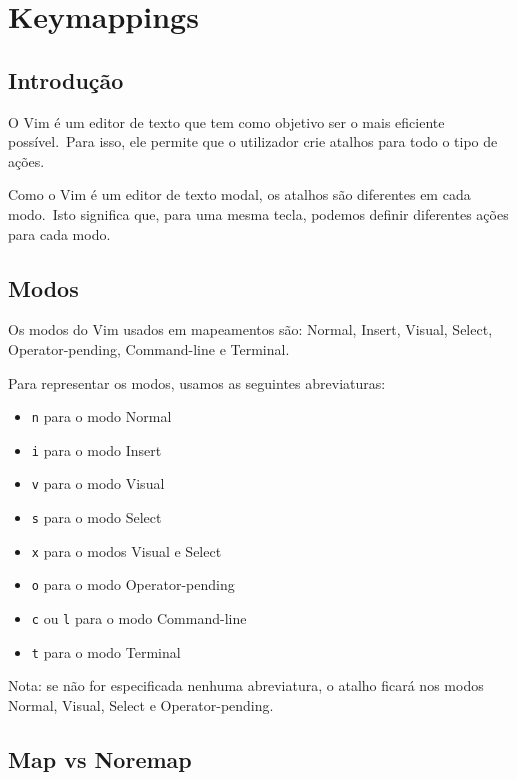 \chapter{Keymappings}
\label{chap:keymappings}

\section{Introdução}

O Vim é um editor de texto que tem como objetivo ser o mais eficiente possível.\ Para isso, ele permite que o utilizador crie atalhos para todo o tipo de ações.

Como o Vim é um editor de texto modal, os atalhos são diferentes em cada modo.\ Isto significa que, para uma mesma tecla, podemos definir diferentes ações para cada modo.

\section{Modos}

Os modos do Vim usados em mapeamentos são: Normal, Insert, Visual, Select, Operator-pending, Command-line e Terminal.

Para representar os modos, usamos as seguintes abreviaturas:

\begin{itemize}\label{itemize:map-modes}
    \setlength{\itemsep}{-5pt} %
    \item \texttt{n} para o modo Normal
    \item \texttt{i} para o modo Insert
    \item \texttt{v} para o modo Visual
    \item \texttt{s} para o modo Select
    \item \texttt{x} para o modos Visual e Select
    \item \texttt{o} para o modo Operator-pending
    \item \texttt{c} ou \texttt{l} para o modo Command-line
    \item \texttt{t} para o modo Terminal
\end{itemize}

Nota: se não for especificada nenhuma abreviatura, o atalho ficará nos modos Normal, Visual, Select e Operator-pending.

\section{Map vs Noremap}
\label{sec:map-vs-noremap}

